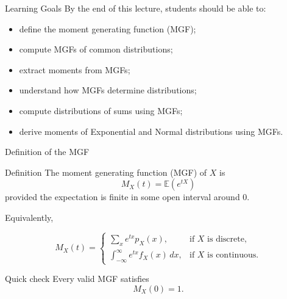 \setcounter{framenumber}{0}

\begin{frame}
  \titlepage
\end{frame}

\begin{frame}{Learning Goals}
By the end of this lecture, students should be able to:
\begin{itemize}
    \item define the moment generating function (MGF);
    \item compute MGFs of common distributions;
    \item extract moments from MGFs;
    \item understand how MGFs determine distributions;
    \item compute distributions of sums using MGFs;
    \item derive moments of Exponential and Normal distributions using MGFs.
\end{itemize}
\end{frame}

\begin{frame}{Definition of the MGF}
\begin{keybox}{Definition}
The moment generating function (MGF) of $X$ is
\[
{
M_X(t)=\mathbb{E}(e^{tX})
}
\]
provided the expectation is finite in some open interval around $0$.

\vspace{0.2cm}

Equivalently,

\[
M_X(t)
=
\begin{cases}
\displaystyle
\sum_x e^{tx} p_X(x),
& \text{if $X$ is discrete},\\[3ex]

\displaystyle
\int_{-\infty}^{\infty} e^{tx} f_X(x)\,dx,
& \text{if $X$ is continuous}.
\end{cases}
\]
\end{keybox}

\vspace{0.25cm}

\begin{keybox}{Quick check}
Every valid MGF satisfies
\[
M_X(0)=1.
\]
\end{keybox}
\end{frame}







